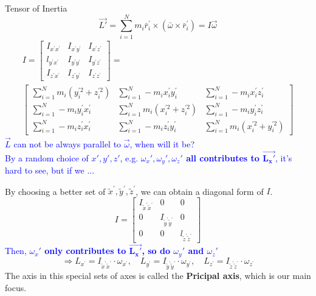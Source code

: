 \documentclass{beamer}
\begin{document}
\begin{frame}{Tensor of Inertia}
  $$\vec{L'} = \sum_{i=1}^{N} m_{i} \bar{r}_{i}^{\prime} \times\left(\bar{\omega} \times \bar{r}_{i}^{\prime}\right) = I\vec{\omega}$$\pause
  $$\begin{gathered}
    {I=\left[\begin{array}{lll}
    I_{x^{\prime} x^{\prime}} & I_{x^{\prime} y^{\prime}} & I_{x^{\prime} z^{\prime}} \\
    l_{y^{\prime} x^{\prime}} & I_{y^{\prime} y^{\prime}} & I_{y^{\prime} z^{\prime}} \\
    I_{z^{\prime} x^{\prime}} & I_{z^{\prime} y^{\prime}} & I_{z^{\prime} z^{\prime}}
    \end{array}\right]=} \\
    {\left[\begin{array}{lll}
    \sum_{i=1}^{N} m_{i}\left(y_{i}^{\prime 2}+z_{i}^{\prime 2}\right) & \sum_{i=1}^{N} -m_{i} x_{i}^{\prime} y_{i}^{\prime} & \sum_{i=1}^{N} -m_{i} x_{i}^{\prime} z_{i}^{\prime} \\
    \sum_{i=1}^{N} -m_{i} y_{i}^{\prime} x_{i}^{\prime} & \sum_{i=1}^{N} m_{i}\left(x_{i}^{\prime 2}+z_{i}^{\prime 2}\right) & \sum_{i=1}^{N} -m_{i} y_{i}^{\prime} z_{i}^{\prime} \\
    \sum_{i=1}^{N} -m_{i} z_{i}^{\prime} x_{i}^{\prime} & \sum_{i=1}^{N} -m_{i} z_{i}^{\prime} y_{i}^{\prime} & \sum_{i=1}^{N} m_{i}\left(x_{i}^{\prime 2}+y_{i}^{\prime 2}\right)
    \end{array}\right]}
    \end{gathered}$$\pause
    \textcolor{blue}{$\vec{L}$ can not be always parallel to $\vec{\omega}$, when will it be?\\
    By a random choice of $x', y', z'$, e.g. \textbf{$\omega_x', \omega_y',\omega_z'$ all contributes to $\vec{\mathbf{L_x'}}$}, it's hard to see, but if we ...}
  \end{frame}

\begin{frame}
  By choosing a better set of $\tilde{x}^{\prime}, \tilde{y}^{\prime}, \tilde{z}^{\prime}$, we can obtain a diagonal form of $I$.
  $$I=\left[\begin{array}{ccc}
    I_{\tilde{x}^{\prime} \tilde{x}^{\prime}} & 0 & 0 \\
    0 & I_{\tilde{y}^{\prime} \tilde{y}^{\prime}} & 0 \\
    0 & 0 & l_{\tilde{z}^{\prime} \tilde{z}^{\prime}}
    \end{array}\right]$$\pause
    \textcolor{blue}{Then, \textbf{$\omega_x'$ only contributes to $\vec{\mathbf{L_x'}}$, so do $\omega_y'$ and $\omega_z'$}}
    $$\Rightarrow L_{x^{\prime}}=I_{\tilde{x}^{\prime} \tilde{x}^{\prime}}\cdot \omega_{x^{\prime}}, \quad L_{y^{\prime}}=I_{\tilde{y}^{\prime} \tilde{y}^{\prime}} \cdot \omega_{y^{\prime}}, \quad L_{z^{\prime}}=I_{\tilde{z}^{\prime} \tilde{z}^{\prime}} \cdot \omega_{z^{\prime}}$$\pause
    The axis in this special sets of axes is called the \textbf{Pricipal axis}, which is our main focus.
\end{frame}
\end{document}
